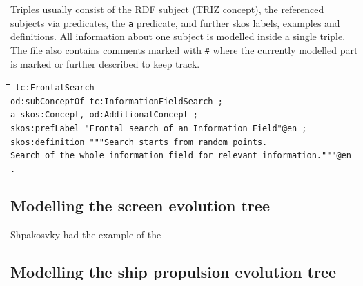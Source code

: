 \documentclass[11pt,a4paper]{article}
\newenvironment{code}{\tt \begin{tabbing}
\hskip12pt\=\hskip12pt\=\hskip12pt\=\hskip12pt\=\hskip5cm\=\hskip5cm\=\kill}
{\end{tabbing}}
\begin{document}
Triples usually consist of the RDF subject (TRIZ concept), the referenced subjects via predicates, the \texttt{a} predicate, and further skos labels, examples and definitions. All information about one subject is modelled inside a single triple. The file also contains comments marked with \texttt{\#} where the currently modelled part is marked or further described to keep track.

\begin{code}\tt
tc:FrontalSearch \\
\> od:subConceptOf tc:InformationFieldSearch ; \\
\> a skos:Concept, od:AdditionalConcept ; \\
\> skos:prefLabel "Frontal search of an Information Field"@en ; \\
\> skos:definition """Search starts from random points. \\
\>\> Search of the whole information field for relevant information."""@en .
\end{code}

\subsection{Modelling the screen evolution tree}

Shpakosvky had the example of the 

\subsection{Modelling the ship propulsion evolution tree}
\end{document}
